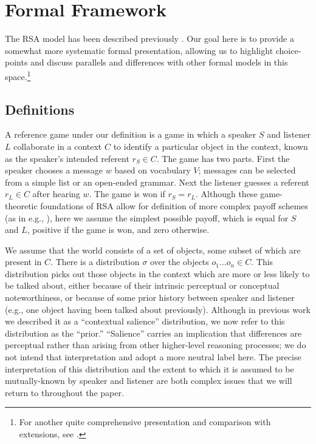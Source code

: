 \documentclass[man]{apa6}
\begin{document}
\section{Formal Framework} \label{sec:models-intro}

The RSA model has been described previously \cite{frank2012,goodman2013,goodman2016}. Our goal here is to provide a somewhat more systematic formal presentation, allowing us to highlight choice-points and discuss parallels and differences with other formal models in this space.\footnote{For another quite comprehensive presentation and comparison with extensions, see .}



\subsection{Definitions}

A reference game under our definition is a game in which a speaker $S$ and listener $L$ collaborate in a context $C$ to identify a particular object in the context, known as the speaker's intended referent $r_S \in C$. The game has two parts. First the speaker chooses a message $w$ based on vocabulary $V$; messages can be selected from a simple list or an open-ended grammar. Next the listener guesses a referent $r_L \in C$ after hearing $w$. The game is won if $r_S=r_L$. Although these game-theoretic foundations of RSA allow for definition of more complex payoff schemes (as in e.g., ), here we assume the simplest possible payoff, which is equal for $S$ and $L$,  positive if the game is won, and zero otherwise.

We assume that the world consists of a set of objects, some subset of which are present in $C$. There is a distribution $\sigma$ over the objects ${o_1 ... o_n} \in C$. This distribution picks out those objects in the context which are more or less likely to be talked about, either because of their intrinsic perceptual or conceptual noteworthiness, or because of some prior history between speaker and listener (e.g., one object having been talked about previously). Although in previous work we described it as a ``contextual salience'' distribution, we now refer to this distribution as the ``prior.''  ``Salience'' carries an implication that differences are perceptual rather than arising from other higher-level reasoning processes; we do not intend that interpretation and adopt a more neutral label here. The precise interpretation of this distribution and the extent to which it is assumed to be mutually-known by speaker and listener are both complex issues that we will return to throughout the paper.
\end{document}
